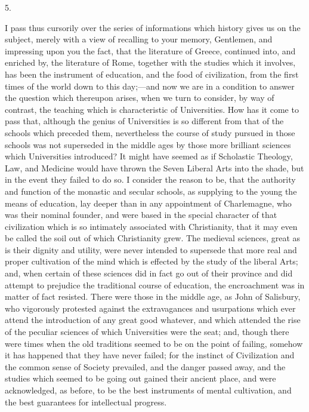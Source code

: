 5.

I pass thus cursorily over the series of informations which history
gives us on the subject, merely with a view of recalling to your
memory, Gentlemen, and impressing upon you the fact, that the
literature of Greece, continued into, and enriched by, the literature
of Rome, together with the studies which it involves, has been the
instrument of education, and the food of civilization, from the first
times of the world down to this day;—and now we are in a condition
to answer the question which thereupon arises, when we turn to
consider, by way of contrast, the teaching which is characteristic of
Universities. How has it come to pass that, although the genius of
Universities is so different from that of the schools which preceded
them, nevertheless the course of study pursued in those schools
was not superseded in the middle ages by those more brilliant sciences
which Universities introduced? It might have seemed as if Scholastic
Theology, Law, and Medicine would have thrown the Seven Liberal Arts
into the shade, but in the event they failed to do so. I consider the
reason to be, that the authority and function of the monastic and
secular schools, as supplying to the young the means of education, lay
deeper than in any appointment of Charlemagne, who was their nominal
founder, and were based in the special character of that civilization
which is so intimately associated with Christianity, that it may even
be called the soil out of which Christianity grew. The medieval
sciences, great as is their dignity and utility, were never intended
to supersede that more real and proper cultivation of the mind which
is effected by the study of the liberal Arts; and, when certain of
these sciences did in fact go out of their province and did attempt to
prejudice the traditional course of education, the encroachment was in
matter of fact resisted. There were those in the middle age, as John
of Salisbury, who vigorously protested against the extravagances and
usurpations which ever attend the introduction of any great good
whatever, and which attended the rise of the peculiar sciences of
which Universities were the seat; and, though there were times when
the old traditions seemed to be on the point of failing, somehow it
has happened that they have never failed; for the instinct of
Civilization and the common sense of Society prevailed, and the danger
passed away, and the studies which seemed to be going out gained their
ancient place, and were acknowledged, as before, to be the best
instruments of mental cultivation, and the best guarantees for
intellectual progress.

